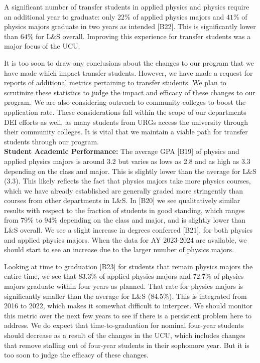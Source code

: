 \documentclass[12pt]{article}
\begin{document}
A significant number of transfer students in applied physics and
physics require an additional year to graduate: only $22\%$ of applied
physics majors and $41\%$ of physics majors graduate in two years as
intended [B22].  This is significantly lower than $64\%$ for L\&S overall.
Improving this experience for transfer students was a major focus of
the UCU.

It is too soon to draw any conclusions about the changes to our
program that we have made which impact transfer students.  However, we
have made a request for reports of additional metrics pertaining to
transfer students.  We plan to scrutinize these statistics to judge
the impact and efficacy of these changes to our program.  We are also
considering outreach to community colleges to boost the application
rate.  These considerations fall within the scope of our departments
DEI efforts as well, as many students from URGs access the university
through their community colleges.  It is vital that we maintain a
viable path for transfer students through our program.\\[3pt]

\noindent
{\bf Student Academic Performance:}
The average GPA [B19] of physics and applied physics majors is around
3.2 but varies as lows as 2.8 and as high as 3.3 depending on the
class and major.  This is slightly lower than the average for L\&S
(3.3).  This likely reflects the fact that physics majors take more
physics courses, which we have already established are generally
graded more stringently than courses from other departments in L\&S.
In [B20] we see qualitatively similar results with respect to the
fraction of students in good standing, which ranges from $79\%$ to
$94\%$ depending on the class and major, and is slightly lower than
L\&S overall.  We see a slight increase in degrees conferred [B21], for both physics
and applied physics majors.  When the data for AY 2023-2024 are
available, we should start to see an increase due to the larger number
of physics majors.

Looking at time to graduation [B23] for students that remain physics
majors the entire time, we see that $83.3\%$ of applied physics majors
and $72.7\%$ of physics majors graduate within four years as planned.
That rate for physics majors is significantly smaller than the average
for L\&S (84.5\%).  This is integrated from 2016 to 2022, which makes
it somewhat difficult to interpret.  We should monitor this metric
over the next few years to see if there is a persistent problem here
to address.  We do expect that time-to-graduation for nominal
four-year students should decrease as a result of the changes in the
UCU, which includes changes that remove stalling out of four-year
students in their sophomore year.  But it is too soon to judge the
efficacy of these changes.\\[3pt]
\end{document}
